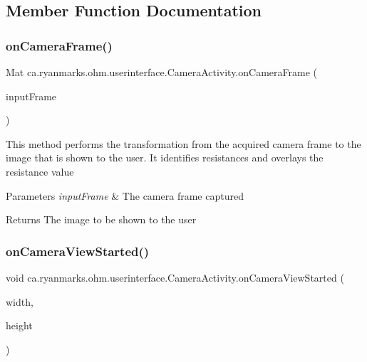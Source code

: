 \subsection{Member Function Documentation}
\hypertarget{classca_1_1ryanmarks_1_1ohm_1_1userinterface_1_1_camera_activity_a91c2f08d2f0fa30ee24c1c8420d0b420}{}\label{classca_1_1ryanmarks_1_1ohm_1_1userinterface_1_1_camera_activity_a91c2f08d2f0fa30ee24c1c8420d0b420} 
\subsubsection{\texorpdfstring{on\+Camera\+Frame()}{onCameraFrame()}}
{\footnotesize\ttfamily Mat ca.\+ryanmarks.\+ohm.\+userinterface.\+Camera\+Activity.\+on\+Camera\+Frame (\begin{DoxyParamCaption}\item[{Camera\+Bridge\+View\+Base.\+Cv\+Camera\+View\+Frame}]{input\+Frame }\end{DoxyParamCaption})}

This method performs the transformation from the acquired camera frame to the image that is shown to the user. It identifies resistances and overlays the resistance value 
\begin{DoxyParams}{Parameters}
{\em input\+Frame} & The camera frame captured \\
\hline
\end{DoxyParams}
\begin{DoxyReturn}{Returns}
The image to be shown to the user 
\end{DoxyReturn}
\hypertarget{classca_1_1ryanmarks_1_1ohm_1_1userinterface_1_1_camera_activity_a57e9b0251cfc888e8514a45f88bec4a4}{}\label{classca_1_1ryanmarks_1_1ohm_1_1userinterface_1_1_camera_activity_a57e9b0251cfc888e8514a45f88bec4a4} 
\subsubsection{\texorpdfstring{on\+Camera\+View\+Started()}{onCameraViewStarted()}}
{\footnotesize\ttfamily void ca.\+ryanmarks.\+ohm.\+userinterface.\+Camera\+Activity.\+on\+Camera\+View\+Started (\begin{DoxyParamCaption}\item[{int}]{width,  }\item[{int}]{height }\end{DoxyParamCaption})}

